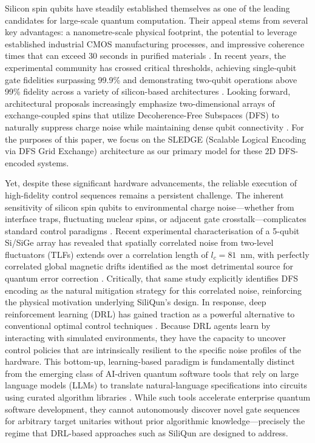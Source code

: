 \documentclass[preprint,12pt, a4paper]{elsarticle}
\begin{document}
Silicon spin qubits have steadily established themselves as one of the leading candidates for large-scale quantum computation. Their appeal stems from several key advantages: a nanometre-scale physical footprint, the potential to leverage established industrial CMOS manufacturing processes, and impressive coherence times that can exceed 30 seconds in purified materials \cite{zwanenburg2013silicon, muhonen2014storing}. In recent years, the experimental community has crossed critical thresholds, achieving single-qubit gate fidelities surpassing 99.9\% \cite{yoneda2018quantum} and demonstrating two-qubit operations above 99\% fidelity across a variety of silicon-based architectures \cite{noiri2022fast, xue2022quantum, mills2022two, madzik2022precision}. Looking forward, architectural proposals increasingly emphasize two-dimensional arrays of exchange-coupled spins that utilize Decoherence-Free Subspaces (DFS) to naturally suppress charge noise while maintaining dense qubit connectivity \cite{sledge2019}. For the purposes of this paper, we focus on the SLEDGE (Scalable Logical Encoding via DFS Grid Exchange) architecture as our primary model for these 2D DFS-encoded systems.

Yet, despite these significant hardware advancements, the reliable execution of high-fidelity control sequences remains a persistent challenge. The inherent sensitivity of silicon spin qubits to environmental charge noise---whether from interface traps, fluctuating nuclear spins, or adjacent gate crosstalk---complicates standard control paradigms \cite{connors2022charge}. Recent experimental characterisation of a 5-qubit Si/SiGe array has revealed that spatially correlated noise from two-level fluctuators (TLFs) extends over a correlation length of $l_c = 81$~nm, with perfectly correlated global magnetic drifts identified as the most detrimental source for quantum error correction \cite{rojasarias2026correlated}. Critically, that same study explicitly identifies DFS encoding as the natural mitigation strategy for this correlated noise, reinforcing the physical motivation underlying SiliQun's design. In response, deep reinforcement learning (DRL) has gained traction as a powerful alternative to conventional optimal control techniques \cite{niu2019universal, fosel2018reinforcement}. Because DRL agents learn by interacting with simulated environments, they have the capacity to uncover control policies that are intrinsically resilient to the specific noise profiles of the hardware. This bottom-up, learning-based paradigm is fundamentally distinct from the emerging class of AI-driven quantum software tools that rely on large language models (LLMs) to translate natural-language specifications into circuits using curated algorithm libraries \cite{classiq2026agent}. While such tools accelerate enterprise quantum software development, they cannot autonomously discover novel gate sequences for arbitrary target unitaries without prior algorithmic knowledge---precisely the regime that DRL-based approaches such as SiliQun are designed to address.
\end{document}
